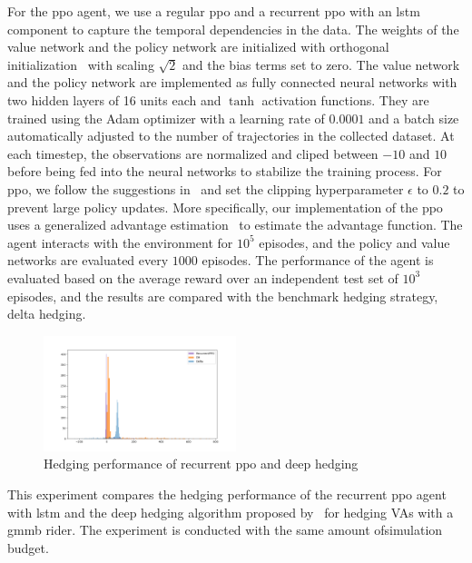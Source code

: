 For the \gls{ppo} agent, we use a regular \gls{ppo} and a recurrent \gls{ppo} with an \gls{lstm} component to capture the temporal dependencies in the data.
The weights of the value network and the policy network are initialized with orthogonal initialization~\citep{engstrom2020implementation} with scaling $\sqrt{2}$ and the bias terms set to zero.
The value network and the policy network are implemented as fully connected neural networks with two hidden layers of 16 units each and $\tanh$ activation functions.
They are trained using the Adam optimizer with a learning rate of $0.0001$ and a batch size automatically adjusted to the number of trajectories in the collected dataset.
At each timestep, the observations are normalized and cliped between $-10$ and $10$ before being fed into the neural networks to stabilize the training process.
For \gls{ppo}, we follow the suggestions in~\cite{schulman2017proximal} and set the clipping hyperparameter $\epsilon$ to $0.2$ to prevent large policy updates. 
More specifically, our implementation of the \gls{ppo} uses a generalized advantage estimation~\citep{schulman2015high} to estimate the advantage function.
The agent interacts with the environment for $10^5$ episodes, and the policy and value networks are evaluated every $1000$ episodes.
The performance of the agent is evaluated based on the average reward over an independent test set of $10^3$ episodes, and the results are compared with the benchmark hedging strategy, delta hedging.

\begin{figure}[ht!]
    \centering
    \includegraphics[width=0.5\textwidth]{./futureWork/figures/PPO_DH.png}
    \caption{Hedging performance of recurrent \gls{ppo} and deep hedging}
    \label{fig3:ppo_dh}
\end{figure}

This experiment compares the hedging performance of the recurrent \gls{ppo} agent with \gls{lstm} and the deep hedging algorithm proposed by~\cite{buehler2019deep} for hedging VAs with a \gls{gmmb} rider.
The experiment is conducted with the same amount ofsimulation budget.

